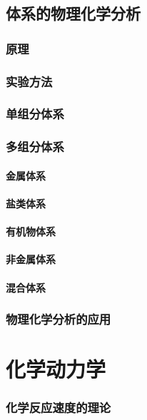 \documentclass[UTF8]{../03-Chemistry}
\begin{document}
\section{体系的物理化学分析}
    \subsection{原理}
    \subsection{实验方法}
    \subsection{单组分体系}
    \subsection{多组分体系}
        \subsubsection{金属体系}
        \subsubsection{盐类体系}
        \subsubsection{有机物体系}
        \subsubsection{非金属体系}
        \subsubsection{混合体系}
    \subsection{物理化学分析的应用}








\chapter{化学动力学}
\subsection{化学反应速度的理论}
\end{document}
